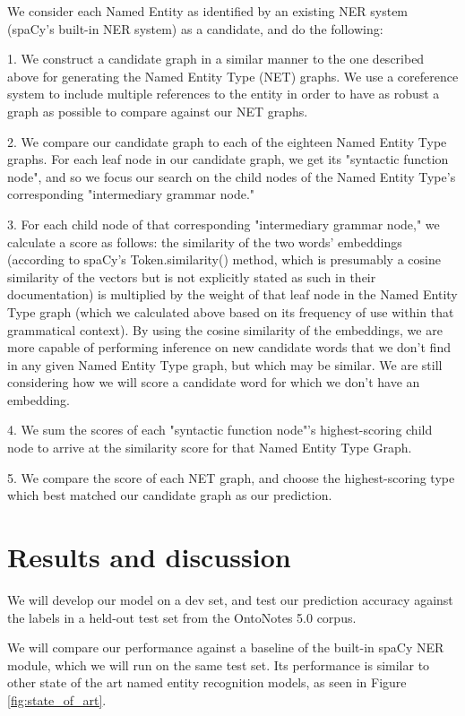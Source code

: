 \documentclass[11pt,a4paper]{article}
\begin{document}
We consider each Named Entity as identified by an existing NER system (spaCy's built-in NER system) as a candidate, and do the following:

1. We construct a candidate graph in a similar manner to the one described above for generating the Named Entity Type (NET) graphs. We use a coreference system to include multiple references to the entity in order to have as robust a graph as possible to compare against our NET graphs.

2. We compare our candidate graph to each of the eighteen Named Entity Type graphs. For each leaf node in our candidate graph, we get its "syntactic function node", and so we focus our search on the child nodes of the Named Entity Type's corresponding "intermediary grammar node."

3. For each child node of that corresponding "intermediary grammar node," we calculate a score as follows: the similarity of the two words' embeddings (according to spaCy's Token.similarity() method, which is presumably a cosine similarity of the vectors but is not explicitly stated as such in their documentation) is multiplied by the weight of that leaf node in the Named Entity Type graph (which we calculated above based on its frequency of use within that grammatical context). By using the cosine similarity of the embeddings, we are more capable of performing inference on new candidate words that we don't find in any given Named Entity Type graph, but which may be similar. We are still considering how we will score a candidate word for which we don't have an embedding.

4. We sum the scores of each "syntactic function node"'s highest-scoring child node to arrive at the similarity score for that Named Entity Type Graph.

5. We compare the score of each NET graph, and choose the highest-scoring type which best matched our candidate graph as our prediction.


\section{Results and discussion}

We will develop our model on a dev set, and test our prediction accuracy against the labels in a held-out test set from the OntoNotes 5.0 corpus.

We will compare our performance against a baseline of the built-in spaCy NER module, which we will run on the same test set. Its performance is similar to other state of the art named entity recognition models, as seen in Figure \ref{fig:state_of_art}.
\end{document}

